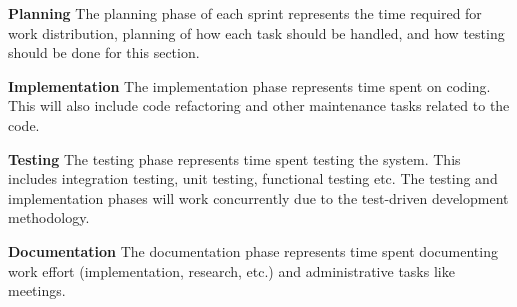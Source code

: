 \textbf{Planning} The planning phase of each sprint represents the time
required for work distribution, planning of how each task should be handled,
and how testing should be done for this section.

\textbf{Implementation} The implementation phase represents time spent on coding.
This will also include code refactoring and other maintenance tasks
related to the code.

\textbf{Testing} The testing phase represents time spent testing the system.
This includes integration testing, unit testing, functional testing etc.
The testing and implementation phases will work concurrently due to the
test-driven development methodology.

\textbf{Documentation} The documentation phase represents time spent
documenting work effort (implementation, research, etc.) and administrative
tasks like meetings.
